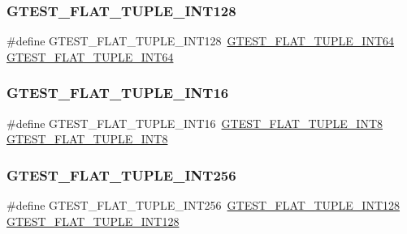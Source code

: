 \subsubsection{\texorpdfstring{GTEST\_FLAT\_TUPLE\_INT128}{GTEST\_FLAT\_TUPLE\_INT128}}
{\footnotesize\ttfamily \#define G\+T\+E\+S\+T\+\_\+\+F\+L\+A\+T\+\_\+\+T\+U\+P\+L\+E\+\_\+\+I\+N\+T128~\mbox{\hyperlink{_obj__test_2lib_2googletest-master_2googletest_2test_2gtest__unittest_8cc_a505487ba755aefa89ddfdc9127621c11}{G\+T\+E\+S\+T\+\_\+\+F\+L\+A\+T\+\_\+\+T\+U\+P\+L\+E\+\_\+\+I\+N\+T64}} \mbox{\hyperlink{_obj__test_2lib_2googletest-master_2googletest_2test_2gtest__unittest_8cc_a505487ba755aefa89ddfdc9127621c11}{G\+T\+E\+S\+T\+\_\+\+F\+L\+A\+T\+\_\+\+T\+U\+P\+L\+E\+\_\+\+I\+N\+T64}}}

\mbox{\label{googletest-master_2googletest_2test_2gtest__unittest_8cc_aae118824bf510fcc9ecc8811db23d2f2}} 
\subsubsection{\texorpdfstring{GTEST\_FLAT\_TUPLE\_INT16}{GTEST\_FLAT\_TUPLE\_INT16}}
{\footnotesize\ttfamily \#define G\+T\+E\+S\+T\+\_\+\+F\+L\+A\+T\+\_\+\+T\+U\+P\+L\+E\+\_\+\+I\+N\+T16~\mbox{\hyperlink{_obj__test_2lib_2googletest-master_2googletest_2test_2gtest__unittest_8cc_af466a50c3676a701b0b9c5db2263f6e7}{G\+T\+E\+S\+T\+\_\+\+F\+L\+A\+T\+\_\+\+T\+U\+P\+L\+E\+\_\+\+I\+N\+T8}} \mbox{\hyperlink{_obj__test_2lib_2googletest-master_2googletest_2test_2gtest__unittest_8cc_af466a50c3676a701b0b9c5db2263f6e7}{G\+T\+E\+S\+T\+\_\+\+F\+L\+A\+T\+\_\+\+T\+U\+P\+L\+E\+\_\+\+I\+N\+T8}}}

\mbox{\label{googletest-master_2googletest_2test_2gtest__unittest_8cc_ac53eae6d18fe053245d04c88c2122882}} 
\subsubsection{\texorpdfstring{GTEST\_FLAT\_TUPLE\_INT256}{GTEST\_FLAT\_TUPLE\_INT256}}
{\footnotesize\ttfamily \#define G\+T\+E\+S\+T\+\_\+\+F\+L\+A\+T\+\_\+\+T\+U\+P\+L\+E\+\_\+\+I\+N\+T256~\mbox{\hyperlink{_obj__test_2lib_2googletest-master_2googletest_2test_2gtest__unittest_8cc_a0ff3eef0b1e2abfee41bdab9631f41ae}{G\+T\+E\+S\+T\+\_\+\+F\+L\+A\+T\+\_\+\+T\+U\+P\+L\+E\+\_\+\+I\+N\+T128}} \mbox{\hyperlink{_obj__test_2lib_2googletest-master_2googletest_2test_2gtest__unittest_8cc_a0ff3eef0b1e2abfee41bdab9631f41ae}{G\+T\+E\+S\+T\+\_\+\+F\+L\+A\+T\+\_\+\+T\+U\+P\+L\+E\+\_\+\+I\+N\+T128}}}

